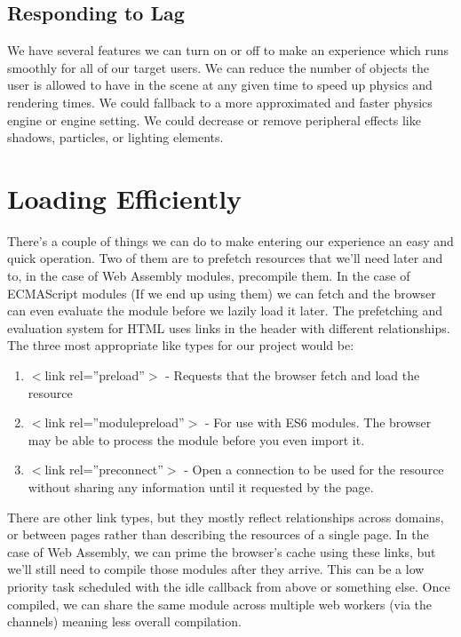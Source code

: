 \documentclass[draftclsnofoot,onecolumn]{IEEEtran}
\begin{document}
\subsection{Responding to Lag}
We have several features we can turn on or off to make an experience which runs smoothly for all of our target users.  We can reduce the number of objects the user is allowed to have in the scene at any given time to speed up physics and rendering times.  We could fallback to a more approximated and faster physics engine or engine setting.  We could decrease or remove peripheral effects like shadows, particles, or lighting elements.
\section{Loading Efficiently}
There’s a couple of things we can do to make entering our experience an easy and quick operation.  Two of them are to prefetch resources that we’ll need later and to, in the case of Web Assembly modules, precompile them.  In the case of ECMAScript modules (If we end up using them) we can fetch and the browser can even evaluate the module before we lazily load it later.  The prefetching and evaluation system for HTML uses links in the header with different relationships.  The three most appropriate like types for our project would be: 
\begin{enumerate}
    \item $<$link rel=”preload”$>$ - Requests that the browser fetch and load the resource
    \item $<$link rel=”modulepreload”$>$ - For use with ES6 modules.  The browser may be able to process the module before you even import it.
    \item $<$link rel=”preconnect”$>$ - Open a connection to be used for the resource without sharing any information until it requested by the page.
\end{enumerate}
There are other link types, but they mostly reflect relationships across domains, or between pages rather than describing the resources of a single page\cite{WEBSITE:10}.  In the case of Web Assembly, we can prime the browser’s cache using these links, but we’ll still need to compile those modules after they arrive.  This can be a low priority task scheduled with the idle callback from above or something else.  Once compiled, we can share the same module across multiple web workers (via the channels) meaning less overall compilation.
\end{document}
